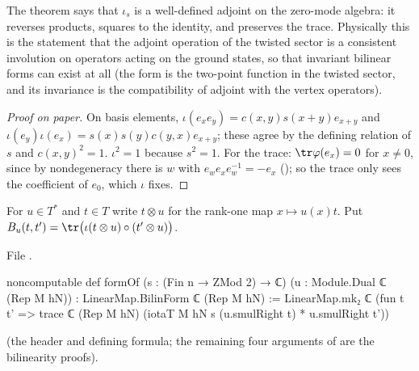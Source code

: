 \begin{physics}
The theorem says that $\iota_s$ is a well-defined adjoint on the zero-mode algebra: it reverses products, squares to the identity, and preserves the trace. Physically this is the statement that the adjoint operation of the twisted sector is a consistent involution on operators acting on the ground states, so that invariant bilinear forms can exist at all (the form is the two-point function in the twisted sector, and its invariance is the compatibility of adjoint with the vertex operators).
\end{physics}
\begin{proof}[Proof on paper]
On basis elements, $\iota(e_xe_y)=c(x,y)s(x+y)e_{x+y}$ and
$\iota(e_y)\iota(e_x)=s(x)s(y)c(y,x)e_{x+y}$; these agree by the defining relation of $s$ and
$c(x,y)^2=1$.  $\iota^2=1$ because $s^2=1$.  For the trace: $\tr\varphi(e_x)=0$ for $x\ne0$, since
by nondegeneracy there is $w$ with $e_we_xe_w^{-1}=-e_x$ (); so the trace
only sees the coefficient of $e_0$, which $\iota$ fixes.
\end{proof}

\begin{definition}\label{ch06:def:formOf}
For $u\in T^*$ and $t\in T$ write $t\otimes u$ for the rank-one map $x\mapsto u(x)t$.  Put
$B_u(t,t')=\tr\bigl(\iota(t\otimes u)\circ(t'\otimes u)\bigr)$.
\end{definition}
\noindent File .
\begin{leancode}
noncomputable def formOf (s : (Fin n → ZMod 2) → ℂ) (u : Module.Dual ℂ (Rep M hN)) :
    LinearMap.BilinForm ℂ (Rep M hN) :=
  LinearMap.mk₂ ℂ
    (fun t t' => trace ℂ (Rep M hN) (iotaT M hN s (u.smulRight t) * u.smulRight t'))
\end{leancode}
(the header and defining formula; the remaining four arguments of  are the
bilinearity proofs).

